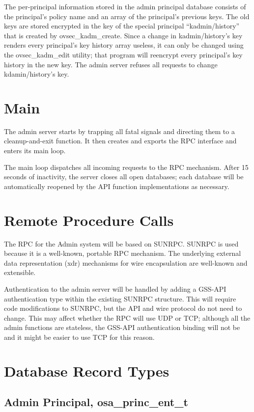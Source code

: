 The per-principal information stored in the admin principal database
consists of the principal's policy name and an array of the
principal's previous keys.  The old keys are stored encrypted in the
key of the special principal ``kadmin/history'' that is created by
ovsec_kadm_create.  Since a change in kadmin/history's key renders
every principal's key history array useless, it can only be changed
using the ovsec_kadm_edit utility; that program will reencrypt every
principal's key history in the new key.  The admin server refuses all
requests to change kdamin/history's key.

\section{Main}

The admin server starts by trapping all fatal signals and directing
them to a cleanup-and-exit function.  It then creates and exports the
RPC interface and enters its main loop.

The main loop dispatches all incoming requests to the RPC mechanism.
After 15 seconds of inactivity, the server closes all open databases;
each database will be automatically reopened by the API function
implementations as necessary.

\section{Remote Procedure Calls}

The RPC for the Admin system will be based on SUNRPC.  SUNRPC is used
because it is a well-known, portable RPC mechanism.  The underlying
external data representation (xdr) mechanisms for wire encapsulation
are well-known and extensible.

Authentication to the admin server will be handled by adding a GSS-API
authentication type within the existing SUNRPC structure.  This will
require code modifications to SUNRPC, but the API and wire protocol do
not need to change.  This may affect whether the RPC will use UDP or
TCP; although all the admin functions are stateless, the GSS-API
authentication binding will not be and it might be easier to use TCP
for this reason.

\section{Database Record Types}
\label{sec:db-types}

\subsection{Admin Principal, osa_princ_ent_t}

